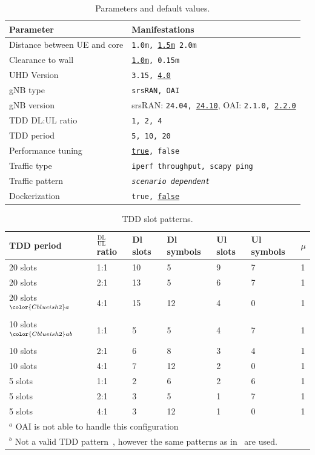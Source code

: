 \begin{table}[htb]
\centering
\caption{Parameters and default values.}
\label{table:meth:parameters}
\begin{tabular}{l | l}
    \toprule
    Parameter & Manifestations \\
    \midrule
    Distance between \gls{UE} and core & \texttt{1.0m, \underline{1.5m} 2.0m} \\
    Clearance to wall & \texttt{\underline{1.0m}, 0.15m} \\
    \gls{UHD} Version & \texttt{3.15, \underline{4.0}} \\
    \gls{gNB} type & \texttt{srsRAN, OAI} \\
    \gls{gNB} version & srsRAN: \texttt{24.04, \underline{24.10}}, OAI: \texttt{2.1.0, \underline{2.2.0}} \\
    \gls{TDD} DL:UL ratio & \texttt{1, 2, 4} \\
    \gls{TDD} period & \texttt{5, 10, 20} \\
    Performance tuning & \texttt{\underline{true}, false} \\
    Traffic type & \texttt{iperf throughput, scapy ping} \\
    Traffic pattern & \texttt{\textit{scenario dependent}} \\
    Dockerization & \texttt{true, \underline{false}} \\

\end{tabular}
\end{table}

\begin{table}[htb]
\centering
\caption{TDD slot patterns.}
\label{table:meth:tddpattern}
\begin{tabular}{l | l | l | l | l | l | l}
    \toprule
    TDD period & $\frac{\text{DL}}{\text{UL}}$ ratio & Dl slots & Dl symbols & Ul slots & Ul symbols & $\mu$ \\
    \midrule
    20 slots      & 1:1 & 10 & 5 & 9 & 7 & 1 \\
    20 slots      & 2:1 & 13 & 5  & 6 & 7 & 1 \\
    20 slots$^{\color{Cblueish2}a}$  & 4:1 & 15 & 12 & 4 & 0 & 1 \\
    10 slots$^{\color{Cblueish2}ab}$ & 1:1 & 5  & 5  & 4 & 7 & 1 \\
    10 slots      & 2:1 & 6  & 8  & 3 & 4 & 1 \\
    10 slots      & 4:1 & 7  & 12 & 2 & 0 & 1 \\
    5 slots       & 1:1 & 2  & 6  & 2 & 6 & 1 \\
    5 slots       & 2:1 & 3  & 5  & 1 & 7 & 1 \\
    5 slots       & 4:1 & 3  & 12 & 1 & 0 & 1 \\
    \multicolumn{7}{l}{\footnotesize {\color{Cblueish2}${}^a$} OAI is not able to handle this configuration} \\
    \multicolumn{7}{l}{\footnotesize {\color{Cblueish2}${}^b$} Not a valid \gls{TDD} pattern~\cite[p. 90]{3gpp38.213},
    however the same patterns as in~\cite{raffeck2024parameterizing} are used.}
\end{tabular}
\end{table}

